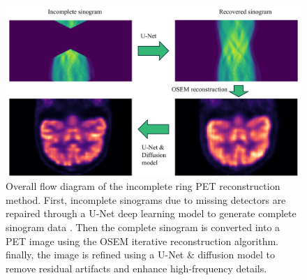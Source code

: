 \documentclass[aps,prb,preprint,groupedaddress,showkeys]{revtex4}
\begin{document}
\begin{figure}[ht]
    \centering
    \includegraphics[width=\textwidth]{Images/reconstruction_workflow}
    \vspace{-.5cm}
    \caption{Overall flow diagram of the incomplete ring PET reconstruction method. First, incomplete sinograms due to missing detectors are repaired through a U-Net deep learning model to generate complete sinogram data . Then the complete sinogram is converted into a PET image using the OSEM iterative reconstruction algorithm.  finally, the image is refined using a U-Net \& diffusion model to remove residual artifacts and enhance high-frequency details. 
  }
    \vspace{-.2cm}
    \label{fig:reconstruction_workflow}
\end{figure}
\end{document}
